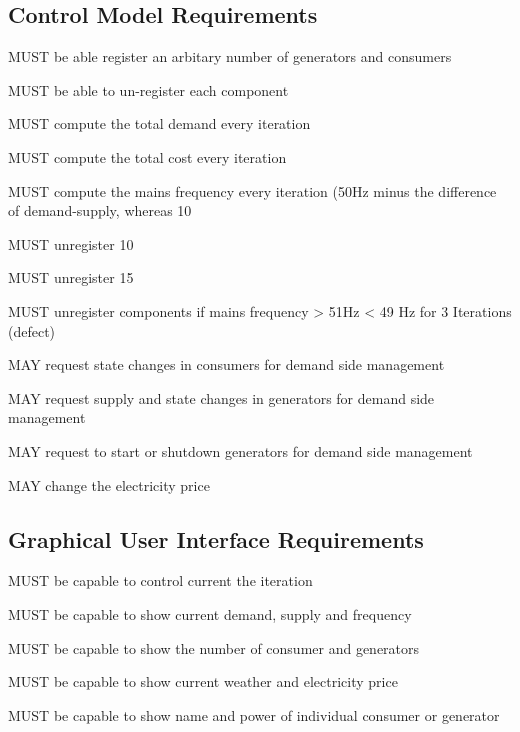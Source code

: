 \begin{description}
    \subsection{Control Model Requirements}
        \item MUST be able register an arbitary number of generators and consumers
        \item MUST be able to un-register each component
        \item MUST compute the total demand every iteration
        \item MUST compute the total cost every iteration
        \item MUST compute the mains frequency every iteration (50Hz minus the difference of demand-supply, whereas 10%
        \item MUST unregister 10%
        \item MUST unregister 15%
        \item MUST unregister components if mains frequency > 51Hz < 49 Hz for 3 Iterations (defect)
        \item MAY request state changes in consumers for demand side management
        \item MAY request supply and state changes in generators for demand side management
        \item MAY request to start or shutdown generators for demand side management
        \item MAY change the electricity price
    \subsection{Graphical User Interface Requirements}
        \item MUST be capable to control current the iteration
        \item MUST be capable to show current demand, supply and frequency
        \item MUST be capable to show the number of consumer and generators
        \item MUST be capable to show current weather and electricity price
        \item MUST be capable to show name and power of individual consumer or generator

\end{description}
